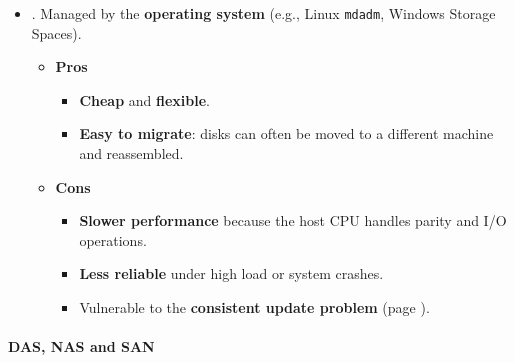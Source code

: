 \begin{itemize}
\begin{itemize}
        \item {}. Managed by the \textbf{operating system} (e.g., Linux \texttt{mdadm}, Windows Storage Spaces).
        \begin{itemize}
            \item[\textcolor{Green3}{\faIcon{check-circle}}] \textcolor{Green3}{\textbf{Pros}}
            \begin{itemize}[label=\textcolor{Green3}{}]
                \item \textbf{Cheap} and \textbf{flexible}.
                \item \textbf{Easy to migrate}: disks can often be moved to a different machine and reassembled.
            \end{itemize}
            \item[\textcolor{Red2}{\faIcon{times-circle}}] \textcolor{Red2}{\textbf{Cons}}
            \begin{itemize}[label=\textcolor{Red2}{}]
                \item \textbf{Slower performance} because the host CPU handles parity and I/O operations.
                \item \textbf{Less reliable} under high load or system crashes.
                \item Vulnerable to the \textbf{consistent update problem} (page ).
            \end{itemize}
        \end{itemize}
    \end{itemize}
\end{itemize}

\newpage

\paragraph{DAS, NAS and SAN}\label{paragraph: DAS, NAS and SAN}


